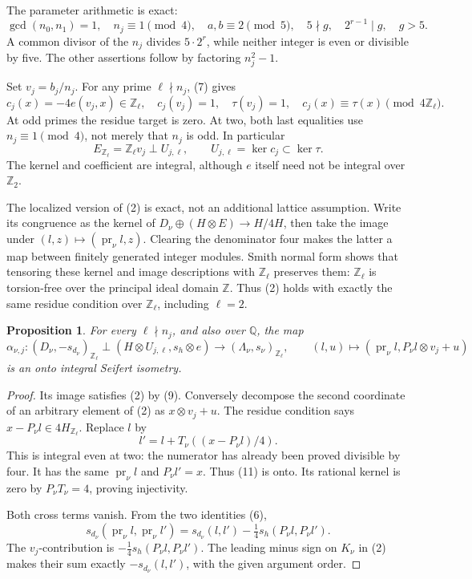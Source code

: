 \documentclass[11pt]{article}
\newtheorem{proposition}[theorem]{Proposition}
\newcommand{\Q}{\mathbb Q}
\newcommand{\Z}{\mathbb Z}
\newcommand{\pr}{\operatorname{pr}}
\begin{document}
The parameter arithmetic is exact:
\[
 \gcd(n_0,n_1)=1,\quad n_j\equiv1\pmod4,\quad
 a,b\equiv2\pmod5,\quad 5\nmid g,\quad 2^{r-1}\mid g,\quad g>5.
                                                               \tag{8}
\]
A common divisor of the \(n_j\) divides \(5\cdot2^r\), while neither
integer is even or divisible by five. The other assertions follow
by factoring \(n_j^2-1\).

Set \(v_j=b_j/n_j\). For any prime \(\ell\nmid n_j\), (7) gives
\[
 c_j(x)=-4e(v_j,x)\in\Z_\ell,\quad
 c_j(v_j)=1,\quad
 \tau(v_j)=1,\quad c_j(x)\equiv\tau(x)\pmod{4\Z_\ell}.             \tag{9}
\]
At odd primes the residue target is zero. At two, both last
equalities use \(n_j\equiv1\pmod4\), not merely that \(n_j\) is odd.
In particular
\[
 E_{\Z_\ell}=\Z_\ell v_j\perp U_{j,\ell},\qquad
 U_{j,\ell}=\ker c_j\subset\ker\tau.                             \tag{10}
\]
The kernel and coefficient are integral, although \(e\) itself
need not be integral over \(\Z_2\).

The localized version of (2) is exact, not an additional lattice
assumption. Write its congruence as the kernel of
\(D_\nu\oplus(H\otimes E)\to H/4H\), then take the image under
\((l,z)\mapsto(\pr_\nu l,z)\). Clearing the denominator four
makes the latter a map between finitely generated integer modules.
Smith normal form shows that tensoring these kernel and image
descriptions with \(\Z_\ell\) preserves them: \(\Z_\ell\) is
torsion-free over the principal ideal domain \(\Z\).
Thus (2) holds with exactly the same residue condition over
\(\Z_\ell\), including \(\ell=2\).

\begin{proposition}\label{prop:local}
For every \(\ell\nmid n_j\), and also over \(\Q\), the map
\[
 \alpha_{\nu,j}:(D_\nu,-s_{d_\nu})_{\Z_\ell}
       \perp(H\otimes U_{j,\ell},s_h\otimes e)
       \longrightarrow(\Lambda_\nu,s_\nu)_{\Z_\ell},\qquad
 (l,u)\longmapsto(\pr_\nu l,P_\nu l\otimes v_j+u)                 \tag{11}
\]
is an onto integral Seifert isometry.
\end{proposition}

\begin{proof}
Its image satisfies (2) by (9). Conversely decompose the second
coordinate of an arbitrary element of (2) as \(x\otimes v_j+u\).
The residue condition says \(x-P_\nu l\in4H_{\Z_\ell}\).
Replace \(l\) by
\[
 l'=l+T_\nu((x-P_\nu l)/4).
                                                               \tag{12}
\]
This is integral even at two: the numerator has already been
proved divisible by four. It has the same \(\pr_\nu l\) and
\(P_\nu l'=x\). Thus (11) is onto. Its rational kernel is zero
by \(P_\nu T_\nu=4\), proving injectivity.

Both cross terms vanish. From the two identities (6),
\[
 s_{d_\nu}(\pr_\nu l,\pr_\nu l')
   =s_{d_\nu}(l,l')-\tfrac14s_h(P_\nu l,P_\nu l').
 \]
The \(v_j\)-contribution is \(-\tfrac14s_h(P_\nu l,P_\nu l')\).
The leading minus sign on \(K_\nu\) in (2) makes their sum
exactly \(-s_{d_\nu}(l,l')\), with the given argument order.
\end{proof}
\end{document}
